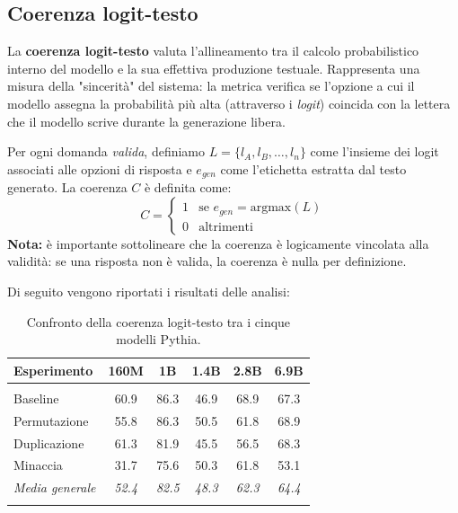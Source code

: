 \documentclass[../relazione.tex]{subfiles}
\begin{document}
\subsection{Coerenza logit-testo}
La \textbf{coerenza logit-testo} valuta l'allineamento tra il calcolo probabilistico interno del modello e la sua effettiva produzione testuale. Rappresenta una misura della "sincerità" del sistema: la metrica verifica se l'opzione a cui il modello assegna la probabilità più alta (attraverso i \textit{logit}) coincida con la lettera che il modello scrive durante la generazione libera.

Per ogni domanda \textit{valida}, definiamo $L = \{l_A, l_B, \dots, l_n\}$ come l'insieme dei logit associati alle opzioni di risposta e $e_{gen}$ come l'etichetta estratta dal testo generato. La coerenza $C$ è definita come:
\[
C = 
\begin{cases} 
1 & \text{se } e_{gen} = \text{argmax}(L) \\
0 & \text{altrimenti}
\end{cases}
\]
\textbf{Nota:} è importante sottolineare che la coerenza è logicamente vincolata alla validità: se una risposta non è valida, la coerenza è nulla per definizione.

Di seguito vengono riportati i risultati delle analisi:
\small
\setlength{\LTcapwidth}{\textwidth}
\begin{xltabular}{\textwidth}{X *{5}{c}}
\toprule
\textbf{Esperimento} & \textbf{160M} & \textbf{1B} & \textbf{1.4B} & \textbf{2.8B} & \textbf{6.9B} \\
\midrule
{}  \\
 \hspace{1em}Baseline & 60.9 & 86.3 & 46.9 & 68.9 & 67.3 \\
 \hspace{1em}Permutazione & 55.8 & 86.3 & 50.5 & 61.8 & 68.9 \\
 \hspace{1em}Duplicazione & 61.3 & 81.9 & 45.5 & 56.5 & 68.3 \\
 \hspace{1em}Minaccia & 31.7 & 75.6 & 50.3 & 61.8 & 53.1 \\
\midrule
{} \hspace{1em}\textit{Media generale} & \textit{52.4} & \textit{82.5} & \textit{48.3} & \textit{62.3} & \textit{64.4} \\
\bottomrule
\caption{Confronto della coerenza logit-testo tra i cinque modelli Pythia.}
\label{tab:comparison_5models_consistency}
\end{xltabular}
\end{document}
